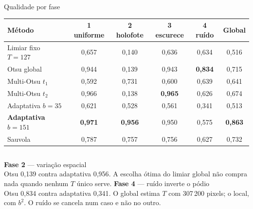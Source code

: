 \documentclass[aspectratio=169,12pt]{beamer}
\newcommand{\sub}[1]{{\small\textcolor{cinza}{#1}}}
\begin{document}
\begin{frame}{Qualidade por fase}

  \scriptsize
  \begin{center}
  \begin{tabular}{@{}lccccc@{}}
    \toprule
    \textbf{Método} & \textbf{1} uniforme & \textbf{2} holofote &
    \textbf{3} escurece & \textbf{4} ruído & \textbf{Global} \\
    \midrule
    Limiar fixo $T=127$        & 0,657 & 0,140 & 0,636 & 0,634 & 0,516 \\
    \textcolor{cOtsu}{Otsu global} & 0,944 & 0,139 & 0,943 & \textbf{0,834} & 0,715 \\
    \textcolor{cMulti}{Multi-Otsu $t_1$} & 0,592 & 0,731 & 0,600 & 0,639 & 0,641 \\
    \textcolor{cMulti}{Multi-Otsu $t_2$} & 0,966 & 0,138 & \textbf{0,965} & 0,626 & 0,674 \\
    \textcolor{cAdapt}{Adaptativa $b{=}35$} & 0,621 & 0,528 & 0,561 & 0,341 & 0,513 \\
    \textcolor{cAdapt}{\textbf{Adaptativa $b{=}151$}} & \textbf{0,971} & \textbf{0,956} & 0,950 & 0,575 & \textbf{0,863} \\
    \textcolor{cAdapt}{Sauvola} & 0,787 & 0,757 & 0,756 & 0,627 & 0,732 \\
    \bottomrule
  \end{tabular}
  \end{center}

  \vspace{1em}
  \normalsize
  \begin{columns}[T,onlytextwidth]
      \textbf{Fase 2} — variação espacial\\[.3em]
      Otsu \textcolor{cMulti}{0,139} contra adaptativa \textcolor{cAdapt}{0,956}.
      \sub{A escolha ótima do limiar global não compra nada quando nenhum
      $T$ único serve.}
      \textbf{Fase 4} — ruído inverte o pódio\\[.3em]
      Otsu \textcolor{cAdapt}{0,834} contra adaptativa \textcolor{cMulti}{0,341}.
      \sub{O global estima $T$ com 307\,200 pixels; o local, com $b^2$. O ruído
      se cancela num caso e não no outro.}
  \end{columns}

\end{frame}
\end{document}
